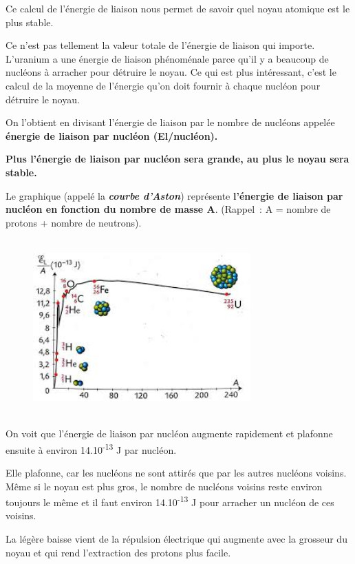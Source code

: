 Ce calcul de l'énergie de liaison nous permet de savoir quel noyau
atomique est le plus stable.

Ce n'est pas tellement la valeur totale de l'énergie de liaison qui
importe. L'uranium a une énergie de liaison phénoménale parce qu'il y a
beaucoup de nucléons à arracher pour détruire le noyau. Ce qui est plus
intéressant, c'est le calcul de la moyenne de l'énergie qu'on doit
fournir à chaque nucléon pour détruire le noyau.

On l'obtient en divisant l'énergie de liaison par le nombre de nucléons
appelée \textbf{énergie de liaison par nucléon (El/nucléon).}

\textbf{Plus l'énergie de liaison par nucléon sera grande, au plus le
noyau sera stable. }

Le graphique (appelé la \emph{\textbf{courbe d'Aston}}) représente
\textbf{l'énergie de liaison par nucléon en fonction du nombre de masse
A}. (Rappel~: A = nombre de protons + nombre de neutrons).

\begin{figure}
\centering
\includegraphics[width=8.348cm,height=6.726cm]{Pictures/1000000000000110000000B9DCC144C0842B84B6.jpg}
\caption{}
\end{figure}

On voit que l'énergie de liaison par nucléon augmente rapidement et
plafonne ensuite à environ 14.10\textsuperscript{-13} J par nucléon.

Elle plafonne, car les nucléons ne sont attirés que par les autres
nucléons voisins. Même si le noyau est plus gros, le nombre de nucléons
voisins reste environ toujours le même et il faut environ
14.10\textsuperscript{-13} J pour arracher un nucléon de ces voisins.

La légère baisse vient de la répulsion électrique qui augmente avec la
grosseur du noyau et qui rend l'extraction des protons plus facile.

